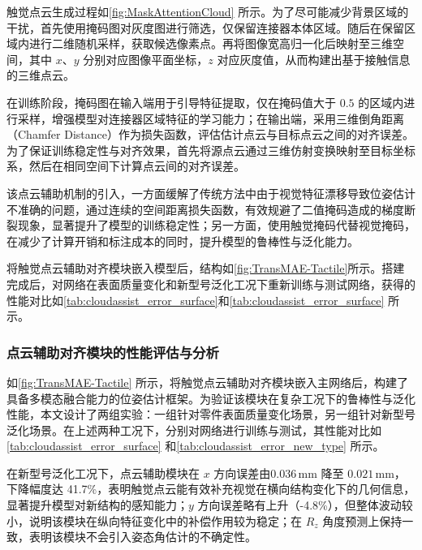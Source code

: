 \documentclass{Diploma}
\begin{document}
触觉点云生成过程如\ref{fig:MaskAttentionCloud} 所示。为了尽可能减少背景区域的干扰，首先使用掩码图对灰度图进行筛选，仅保留连接器本体区域。随后在保留区域内进行二维随机采样，获取候选像素点。再将图像宽高归一化后映射至三维空间，其中 $x$、$y$ 分别对应图像平面坐标，$z$ 对应灰度值，从而构建出基于接触信息的三维点云。

%

在训练阶段，掩码图在输入端用于引导特征提取，仅在掩码值大于 $0.5$ 的区域内进行采样，增强模型对连接器区域特征的学习能力；在输出端，采用三维倒角距离（Chamfer Distance）作为损失函数，评估估计点云与目标点云之间的对齐误差。为了保证训练稳定性与对齐效果，首先将源点云通过三维仿射变换映射至目标坐标系，然后在相同空间下计算点云间的对齐误差。

该点云辅助机制的引入，一方面缓解了传统方法中由于视觉特征漂移导致位姿估计不准确的问题，通过连续的空间距离损失函数，有效规避了二值掩码造成的梯度断裂现象，显著提升了模型的训练稳定性；另一方面，使用触觉掩码代替视觉掩码，在减少了计算开销和标注成本的同时，提升模型的鲁棒性与泛化能力。

将触觉点云辅助对齐模块嵌入模型后，结构如\ref{fig:TransMAE-Tactile}所示。搭建完成后，对网络在表面质量变化和新型号泛化工况下重新训练与测试网络，获得的性能对比如\ref{tab:cloudassist_error_surface}和\ref{tab:cloudassist_error_surface} 所示。

\subsubsection{点云辅助对齐模块的性能评估与分析}
%

如\ref{fig:TransMAE-Tactile} 所示，将触觉点云辅助对齐模块嵌入主网络后，构建了具备多模态融合能力的位姿估计框架。为验证该模块在复杂工况下的鲁棒性与泛化性能，本文设计了两组实验：一组针对零件表面质量变化场景，另一组针对新型号泛化场景。在上述两种工况下，分别对网络进行训练与测试，其性能对比如\ref{tab:cloudassist_error_surface} 和\ref{tab:cloudassist_error_new_type} 所示。

在新型号泛化工况下，点云辅助模块在 $x$ 方向误差由$ 0.036\,\mathrm{mm}$ 降至 $0.021\,\mathrm{mm}$，下降幅度达 41.7\%，表明触觉点云能有效补充视觉在横向结构变化下的几何信息，显著提升模型对新结构的感知能力；$y$ 方向误差略有上升（-4.8\%），但整体波动较小，说明该模块在纵向特征变化中的补偿作用较为稳定；在 $R_z$ 角度预测上保持一致，表明该模块不会引入姿态角估计的不确定性。
\end{document}
